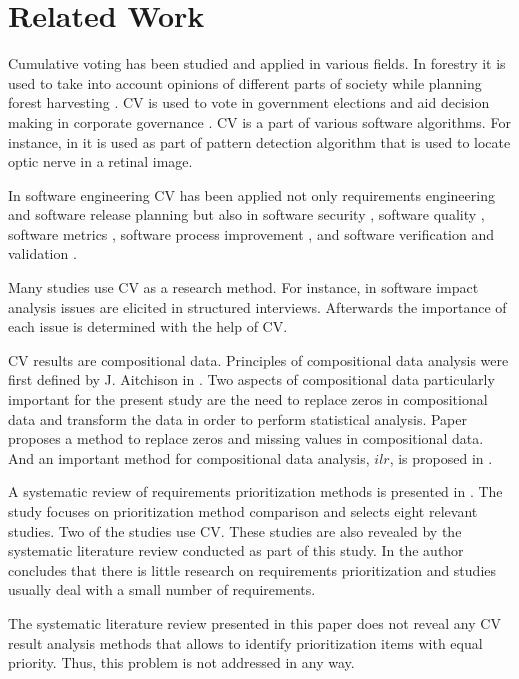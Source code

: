 \section{Related Work\label{relatedwork}}

Cumulative voting has been studied and applied in various fields.
In forestry it is used to take into account opinions of different parts of society while planning forest harvesting \cite{Laukkanen2004}.
CV is used to vote in government elections \cite{Cooper2010}
and aid decision making in corporate governance \cite{Bhagat1984}.
CV is a part of various software algorithms.
For instance, in \cite{Hoover2003} it is used as part of pattern detection algorithm that is used to locate optic nerve in a retinal image.

In software engineering CV has been applied not only requirements engineering and software release planning \cite{Heikkila2010}
but also in software security \cite{Baca2010}, software quality \cite{Barney2009b}, software metrics \cite{Berander2006}, software process improvement \cite{Pettersson2008}, and software verification and validation \cite{Feldt2010}.

Many studies use CV as a research method.
For instance, in \cite{Svahnberg2008} software impact analysis issues are elicited in structured interviews.
Afterwards the importance of each issue is determined with the help of CV.

CV results are compositional data. Principles of compositional data analysis were first defined by J. Aitchison in \cite{Aitchison1982a}.
Two aspects of compositional data particularly important for the present study are
the need to replace zeros in compositional data
and transform the data in order to perform statistical analysis.
Paper \cite{Martin-Fernandez2003} proposes a method to replace zeros and missing values in compositional data.
And an important method for compositional data analysis, $ilr$, is proposed in \cite{Egozcue2003}.

A systematic review of requirements prioritization methods is presented in \cite{Khan2006}. The study focuses on prioritization method comparison and selects eight relevant studies. Two of the studies use CV. These studies are also revealed by the systematic literature review conducted as part of this study. In \cite{Khan2006} the author concludes that there is little research on requirements prioritization and studies usually deal with a small number of requirements.

The systematic literature review presented in this paper does not reveal any CV result analysis methods that allows to identify prioritization items with equal priority. Thus, this problem is not addressed in any way.